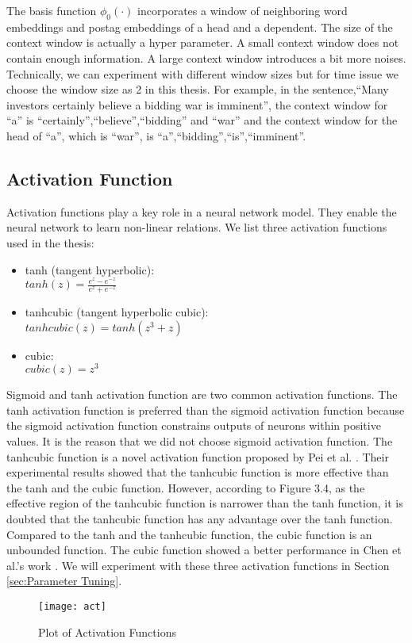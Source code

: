 The basis function $\phi_0(\cdot)$ incorporates a window of neighboring word embeddings and postag embeddings of a head and a dependent. The size of the context window is actually a hyper parameter. A small context window does not contain enough information. A large context window introduces a bit more noises. Technically, we can experiment with different window sizes but for time issue we choose the window size as 2 in this thesis. For example, in the sentence,``Many investors certainly believe a bidding war is imminent'', the context window for ``a'' is ``certainly'',``believe'',``bidding'' and ``war'' and the context window for the head of ``a'', which is ``war'', is ``a'',``bidding'',``is'',``imminent''. 
\subsection{Activation Function}
\label{sec:acts}
Activation functions play a key role in a neural network model. They enable the neural network to learn non-linear relations. We list three activation functions used in the thesis:
\begin{itemize}  
\item tanh (tangent hyperbolic):\\
$tanh(z)=\frac{e^{z}-e^{-z}}{e^z+e^{-z}}$
\item tanhcubic (tangent hyperbolic cubic):\\
$tanhcubic(z)=tanh(z^3+z)$
\item cubic:\\
$cubic(z)=z^3$
\end{itemize}
Sigmoid and tanh activation function are two common activation functions. The tanh activation function is preferred than the sigmoid activation function because the sigmoid activation function constrains outputs of neurons within positive values. It is the reason that we did not choose sigmoid activation function. The tanhcubic function
is a novel activation function proposed by Pei et al. \cite{pei2015}. Their experimental results showed
that the tanhcubic function is more effective than the tanh and the cubic function. However,
according to Figure 3.4, as the effective region of the tanhcubic function is narrower than
the tanh function, it is doubted that the tanhcubic function has any advantage over the tanh
function. Compared to the tanh and the tanhcubic function, the cubic function is an unbounded function. The cubic function showed a better performance in Chen et al.'s work \cite{chen2014fast}. We
will experiment with these three activation functions in Section \ref{sec:Parameter Tuning}.
\begin{figure}
  \centering
    \texttt{[image: act]}
  \caption{Plot of Activation Functions}
  \label{fig:act}
\end{figure}

